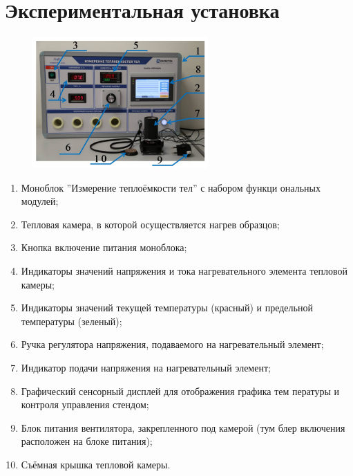 \documentclass[a4paper]{article}
\begin{document}
\section{\textbf{Экспериментальная установка}}

\begin{figure}[H]
\begin{center}
\includegraphics[width=0.6\textwidth]{2}
\end{center}
\end{figure}
\begin{enumerate} 
  \item Моноблок ”Измерение теплоёмкости тел” с набором функци
ональных модулей;
  \item Тепловая камера, в которой осуществляется нагрев образцов;
  \item Кнопка включение питания моноблока;
  \item Индикаторы значений напряжения и тока нагревательного элемента тепловой камеры;
  \item Индикаторы значений текущей температуры (красный) и предельной температуры (зеленый);
  \item Ручка регулятора напряжения, подаваемого на нагревательный элемент;
  \item Индикатор подачи напряжения на нагревательный элемент;
  \item Графический сенсорный дисплей для отображения графика тем
пературы и контроля управления стендом;
  \item Блок питания вентилятора, закрепленного под камерой (тум
блер включения расположен на блоке питания);
  \item Съёмная крышка тепловой камеры.
\end{enumerate}
\end{document}
